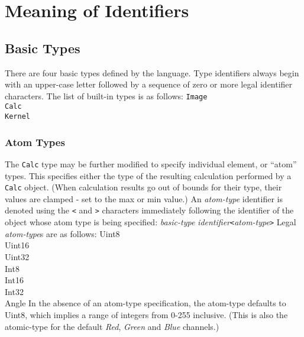 \section{Meaning of Identifiers}
\label{sec:identmeaning}

\subsection{Basic Types}
\label{ssec:types}
There are four basic types defined by the \sys{} language.
Type identifiers always begin with an upper-case letter followed by a sequence
of zero or more legal identifier characters. The list of built-in types is as follows:
\startsyn
\texttt{Image} \\
\texttt{Calc} \\
\texttt{Kernel}
\stopsyn 

\subsubsection{Atom Types}
\label{sssec:atomtypes}
The \texttt{Calc} type may be further modified
to specify individual element, or ``atom'' types. This specifies either the type
of the resulting calculation performed by a \texttt{Calc} object. (When calculation
results go out of bounds for their type, their values are clamped - set to the max or min value.)
An \emph{atom-type} identifier is denoted using the \texttt{<} and \texttt{>}
characters immediately following the identifier of the object whose atom type
is being specified:
\startsyn
\emph{basic-type} \emph{identifier}\texttt{<}\emph{atom-type}\texttt{>}
\stopsyn
Legal \emph{atom-type}s are as follows:
\startsyn
Uint8 \\
Uint16 \\
Uint32 \\
Int8 \\
Int16 \\
Int32 \\
Angle
\stopsyn
In the absence of an atom-type specification, the atom-type defaults to Uint8,
which implies a range of integers from 0-255 inclusive. (This is also the atomic-type
for the default \emph{Red}, \emph{Green} and \emph{Blue} channels.)

